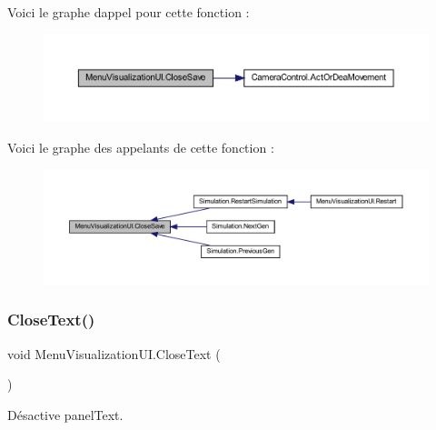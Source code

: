 Voici le graphe d\textquotesingle{}appel pour cette fonction \+:
\nopagebreak
\begin{figure}[H]
\begin{center}
\leavevmode
\includegraphics[width=350pt]{class_menu_visualization_u_i_a262b9857eed5d1a7e749beb653a88cad_cgraph}
\end{center}
\end{figure}
Voici le graphe des appelants de cette fonction \+:
\nopagebreak
\begin{figure}[H]
\begin{center}
\leavevmode
\includegraphics[width=350pt]{class_menu_visualization_u_i_a262b9857eed5d1a7e749beb653a88cad_icgraph}
\end{center}
\end{figure}
\mbox{\label{class_menu_visualization_u_i_a5f689cefeb05b7bfdc19c56179deb6ef}} 
\subsubsection{\texorpdfstring{Close\+Text()}{CloseText()}}
{\footnotesize\ttfamily void Menu\+Visualization\+U\+I.\+Close\+Text (\begin{DoxyParamCaption}{ }\end{DoxyParamCaption})\hspace{0.3cm}{\ttfamily [inline]}}



Désactive panel\+Text. 

\mbox{\label{class_menu_visualization_u_i_ade48d2d4dd652f9f693072bf3d6a5c1c}} 
